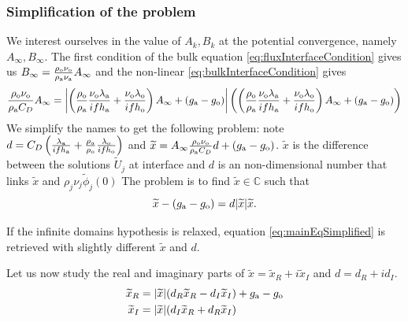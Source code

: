 \subsubsection{Simplification of the problem}
We interest ourselves in the
value of $A_k, B_k$ at the potential convergence, namely $A_\infty, B_\infty$.
The first condition of the bulk equation \eqref{eq:fluxInterfaceCondition} gives us $B_\infty = \frac{\rho_{\rm o} \nu_{\rm o}}{\rho_{\rm a} \nu_{\rm a} } A_\infty$
and the non-linear \eqref{eq:bulkInterfaceCondition} gives
\begin{equation} \label{eq:stationaryBulkFirstEq}
    \frac{\rho_{\rm o} \nu_{\rm o}}{\rho_{\rm a} C_D} A_\infty
    =
    \left|
    \left(
    \frac{\rho_{\rm o}}{\rho_{\rm a}}\frac{\nu_{\rm o}\lambda_{\rm a}}{if h_{\rm a}} 
    +\frac{\nu_{\rm o}\lambda_{\rm o}}{if h_{\rm o}} \right) A_\infty
    + (g_{\rm a} - g_{\rm o})
    \right|
    \left(
    \left(
    \frac{\rho_{\rm o}}{\rho_{\rm a}}\frac{\nu_{\rm o}\lambda_{\rm a}}{if h_{\rm a}} 
    +\frac{\nu_{\rm o}\lambda_{\rm o}}{if h_{\rm o}} \right) A_\infty
    + (g_{\rm a} - g_{\rm o})
    \right)
\end{equation}
We simplify the names to get the following problem:
note $d = C_D \left(
    \frac{\lambda_{\rm a}}{if h_{\rm a}} 
    +\frac{\rho_{\rm a}}{\rho_{\rm o}}\frac{\lambda_{\rm o}}{if h_{\rm o}} \right)$ and
$\widetilde{x} = A_\infty \frac{\rho_{\rm o} \nu_{\rm o}}{\rho_{\rm a} C_D}d+\left(g_{\rm a} - g_{\rm o}\right)$.
$\widetilde{x}$ is the difference between the
solutions $\widetilde{U}_j$ at interface
and $d$ is an non-dimensional number that links
$\widetilde{x}$ and $\rho_j \nu_j \widetilde{\phi}_j(0)$
The problem is to find $\widetilde{x}\in \mathbb{C}$ such that
\begin{equation} \label{eq:mainEqSimplified}
    \widetilde{x} - \left(g_{\rm a} - g_{\rm o}\right) = d|\widetilde{x}|\widetilde{x}.
\end{equation}
\begin{remark}
If the infinite domains hypothesis is relaxed, equation \eqref{eq:mainEqSimplified} is retrieved with slightly different $\widetilde{x}$ and $d$.
\end{remark}
Let us now study the real and imaginary parts of $\widetilde{x}=\widetilde{x}_R+i{\widetilde{x}_I}$ and $d={d_R}+i{d_I}$.
\begin{equation}
    \begin{aligned}
    \widetilde{x}_R &= |\widetilde{x}|({d_R} \widetilde{x}_R - {d_I}{\widetilde{x}_I}) +g_{\rm a} - g_{\rm o} \\
    {\widetilde{x}_I} &= |\widetilde{x}|({d_I}\widetilde{x}_R + {d_R}{\widetilde{x}_I})
    \end{aligned}
\end{equation}

